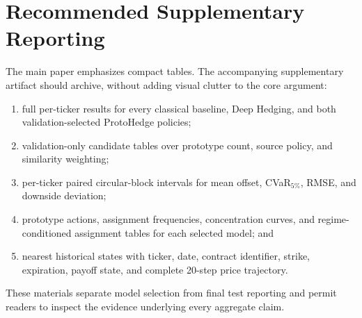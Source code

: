 \documentclass[sigconf]{acmart}
\begin{document}
\section{Recommended Supplementary Reporting}
\label{app:supplementary}

The main paper emphasizes compact tables. The accompanying supplementary
artifact should archive, without adding visual clutter to the core argument:
\begin{enumerate}
    \item full per-ticker results for every classical baseline, Deep Hedging,
    and both validation-selected ProtoHedge policies;
    \item validation-only candidate tables over prototype count, source
    policy, and similarity weighting;
    \item per-ticker paired circular-block intervals for mean offset,
    CVaR$_{5\%}$, RMSE, and downside deviation;
    \item prototype actions, assignment frequencies, concentration curves,
    and regime-conditioned assignment tables for each selected model; and
    \item nearest historical states with ticker, date, contract identifier,
    strike, expiration, payoff state, and complete 20-step price trajectory.
\end{enumerate}

These materials separate model selection from final test reporting and permit
readers to inspect the evidence underlying every aggregate claim.
\end{document}
